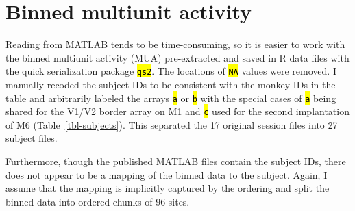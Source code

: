 \documentclass[
  10pt,
  letterpaper,
  DIV=11,
  numbers=noendperiod]{scrartcl}
\let\OldTexttt\texttt
\renewcommand{\texttt}[1]{\OldTexttt{\hl{#1}}}
\begin{document}
\section{Binned multiunit activity}\label{binned-multiunit-activity}

Reading from MATLAB tends to be time-consuming, so it is easier to work
with the binned multiunit activity (MUA) pre-extracted and saved in R
data files with the quick serialization package \texttt{qs2}. The
locations of \texttt{NA} values were removed. I manually recoded the
subject IDs to be consistent with the monkey IDs in the table and
arbitrarily labeled the arrays \texttt{a} or \texttt{b} with the special
cases of \texttt{a} being shared for the V1/V2 border array on M1 and
\texttt{c} used for the second implantation of M6
(Table~\ref{tbl-subjects}). This separated the 17 original session files
into 27 subject files.

Furthermore, though the published MATLAB files contain the subject IDs,
there does not appear to be a mapping of the binned data to the subject.
Again, I assume that the mapping is implicitly captured by the ordering
and split the binned data into ordered chunks of 96 sites.

\begin{table}

\caption{\label{tbl-subjects}Original MATLAB subject IDs from Lee et
al.~(left) and new IDs for this project (right).}


\end{table}%
\end{document}
